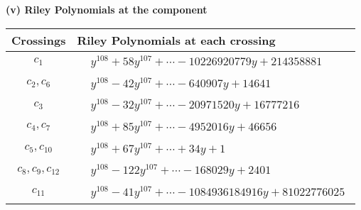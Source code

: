 \documentclass[1p]{elsarticle_modified}
\theoremstyle{definition}
\begin{document}
\newpage\renewcommand{\arraystretch}{1}
\flushleft \textbf{(v) Riley Polynomials at the component}\newline \\
\begin{tabular}{m{50pt}|m{274pt}}
Crossings & \hspace{64pt}Riley Polynomials at each crossing \\
\hline $$\begin{aligned}c_{1}\end{aligned}$$&$\begin{aligned}
&y^{108}+58 y^{107}+\cdots-10226920779 y+214358881
\end{aligned}$\\
\hline $$\begin{aligned}c_{2},c_{6}\end{aligned}$$&$\begin{aligned}
&y^{108}-42 y^{107}+\cdots-640907 y+14641
\end{aligned}$\\
\hline $$\begin{aligned}c_{3}\end{aligned}$$&$\begin{aligned}
&y^{108}-32 y^{107}+\cdots-20971520 y+16777216
\end{aligned}$\\
\hline $$\begin{aligned}c_{4},c_{7}\end{aligned}$$&$\begin{aligned}
&y^{108}+85 y^{107}+\cdots-4952016 y+46656
\end{aligned}$\\
\hline $$\begin{aligned}c_{5},c_{10}\end{aligned}$$&$\begin{aligned}
&y^{108}+67 y^{107}+\cdots+34 y+1
\end{aligned}$\\
\hline $$\begin{aligned}c_{8},c_{9},c_{12}\end{aligned}$$&$\begin{aligned}
&y^{108}-122 y^{107}+\cdots-168029 y+2401
\end{aligned}$\\
\hline $$\begin{aligned}c_{11}\end{aligned}$$&$\begin{aligned}
&y^{108}-41 y^{107}+\cdots-1084936184916 y+81022776025
\end{aligned}$\\
\hline
\end{tabular}\\~\\
\end{document}
